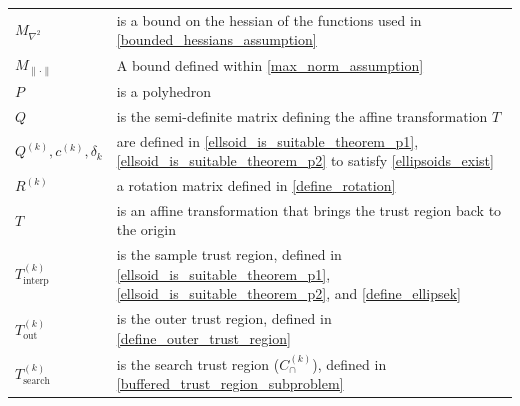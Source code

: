 \documentclass{article}
\theoremstyle{case}
\newcommand{\capcones}{{C^{(k)}_{\cap}}}
\newcommand{\ck}{{c^{(k)}}}
\newcommand{\maxhessian}{{M_{\nabla^2}}}
\newcommand{\maxnorm}{{M_{\|\cdot\|}}}
\newcommand{\outertrk}{{T_{\text{out}}^{(k)}}}
\newcommand{\qk}{{Q^{(k)}}}
\newcommand{\rotk}{{R^{(k)}}}
\newcommand{\sampletrk}{{T_{\text{interp}}^{(k)}}}
\newcommand{\sdk}{{\delta_k}}
\newcommand{\searchtrk}{{T_{\text{search}}^{(k)}}}
\begin{document}
\begin{longtable}{| p{} | p{} |}
$\maxhessian$ & is a bound on the hessian of the functions used in \cref{bounded_hessians_assumption} \\ %
$\maxnorm $ & A bound defined within \cref{max_norm_assumption} \\ %
$P$ & is a polyhedron \\ %
$Q$ & is the semi-definite matrix defining the affine transformation $T$ \\ %
$\qk, \ck, \sdk$ & are defined in \cref{ellsoid_is_suitable_theorem_p1}, \cref{ellsoid_is_suitable_theorem_p2} to satisfy \cref{ellipsoids_exist} \\ %
$\rotk$ & a rotation matrix defined in \cref{define_rotation} \\ %
$T$ & is an affine transformation that brings the trust region back to the origin \\ %
$\sampletrk $           & is the sample trust region, defined in \cref{ellsoid_is_suitable_theorem_p1}, \cref{ellsoid_is_suitable_theorem_p2}, and \cref{define_ellipsek} \\ %
$\outertrk $            & is the outer trust region, defined in \cref{define_outer_trust_region} \\ %
$\searchtrk $           & is the search trust region ($\capcones$), defined in \cref{buffered_trust_region_subproblem} \\ %

\end{longtable}
\end{document}
